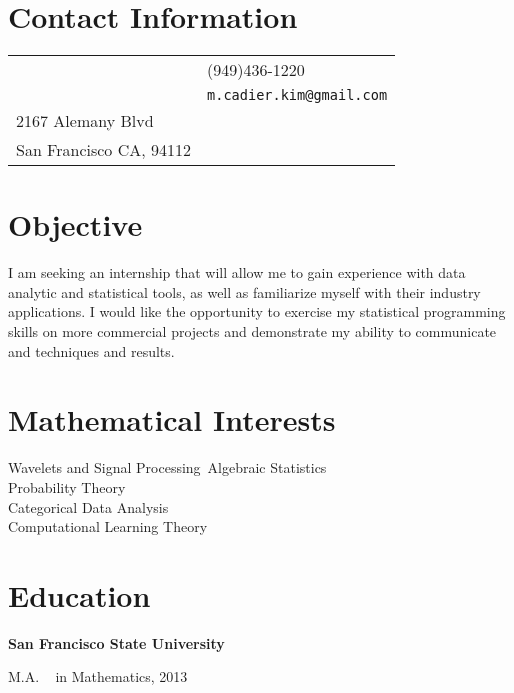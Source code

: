 \documentclass[margin,line,pifont,palatino,courier]{res}
\newenvironment{list1}{
  \begin{list}{\ding{113}}{%
      \setlength{\itemsep}{0in}
      \setlength{\parsep}{0in} \setlength{\parskip}{0in}
      \setlength{\topsep}{0in} \setlength{\partopsep}{0in}
      \setlength{\leftmargin}{0.17in}}}{\end{list}}
\begin{document}

\begin{resume}

\section{\sc Contact Information}

\vspace{.05in}
\begin{tabular}{@{}p{2.75in}p{2in}}
  & (949)436-1220 \\
                     & \verb+m.cadier.kim@gmail.com+\\

2167 Alemany Blvd              & \\
San Francisco CA, 94112              & \\
\end{tabular}


\section{\sc Objective}  I am seeking an internship that will allow me to gain experience with data analytic and statistical tools, as well as familiarize myself with their industry applications.  I would like the opportunity to exercise my statistical programming skills on more commercial projects and demonstrate my ability to communicate and techniques and results. 

\section{\sc Mathematical Interests}
 Wavelets and Signal Processing\
 Algebraic Statistics\\
 Probability Theory\\
 Categorical Data Analysis\\
  Computational Learning Theory\\
 

\section{\sc Education}



{\bf San Francisco State University}\\
\vspace*{-.1in}
\begin{list1}
\item  M.A. ~ in Mathematics, 2013


\end{list1}
\end{resume}
\end{document}
